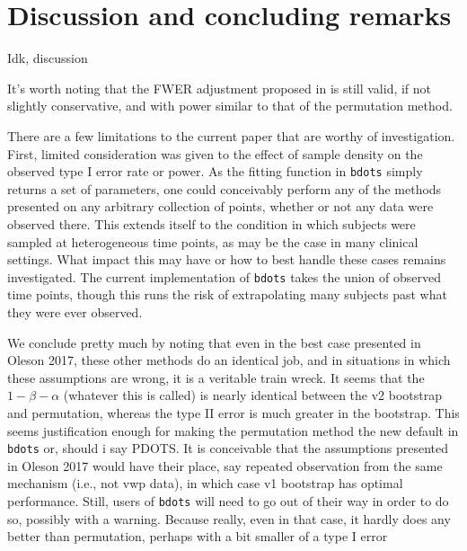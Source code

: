 \documentclass{article}
\newcommand{\xt}{\texttt}
\begin{document}
\section{Discussion and concluding remarks}

Idk, discussion

It's worth noting that the FWER adjustment proposed in \cite{Oleson2017} is still valid, if not slightly conservative, and with power similar to that of the permutation method.

There are a few limitations to the current paper that are worthy of investigation. First, limited consideration was given to the effect of sample density on the observed type I error rate or power. As the fitting function in \xt{bdots} simply returns a set of parameters, one could conceivably perform any of the methods presented on any arbitrary collection of points, whether or not any data were observed there. This extends itself to the condition in which subjects were sampled at heterogeneous time points, as may be the case in many clinical settings. What impact this may have or how to best handle these cases remains investigated. The current implementation of \xt{bdots} takes the union of observed time points, though this runs the risk of extrapolating many subjects past what they were ever observed.

We conclude pretty much by noting that even in the best case presented in Oleson 2017, these other methods do an identical job, and in situations in which these assumptions are wrong, it is a veritable train wreck. It seems that the $1 - \beta - \alpha$ (whatever this is called) is nearly identical between the v2 bootstrap and permutation, whereas the type II error is much greater in the bootstrap. This seems justification enough for making the permutation method the new default in \xt{bdots} or, should i say PDOTS. It is conceivable that the assumptions presented in Oleson 2017 would have their place, say repeated observation from the same mechanism (i.e., not vwp data), in which case v1 bootstrap has optimal performance. Still, users of \xt{bdots} will need to go out of their way in order to do so, possibly with a warning. Because really, even in that case, it hardly does any better than permutation, perhaps with a bit smaller of a type I error


\end{document}
